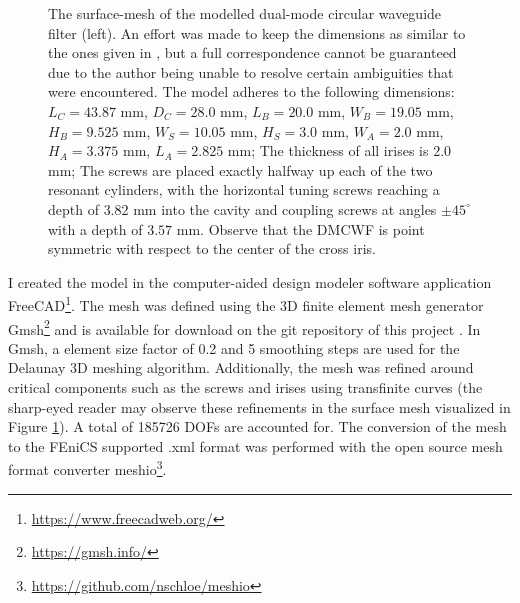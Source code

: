 \documentclass[11pt, a4paper]{article}
\begin{document}
\begin{figure}[h]
    \centering
    
    \caption{The surface-mesh of the modelled dual-mode circular waveguide filter
    (left). An effort was made to keep the dimensions as similar to the ones
    given in \cite{DMCWF-Dimensions}, but a full correspondence cannot be guaranteed
    due to the author being unable to resolve certain ambiguities that were encountered.
    The model adheres to the following dimensions:
    $L_C=43.87$ mm, $D_C=28.0$ mm, $L_B=20.0$ mm, $W_B=19.05$ mm, $H_B=9.525$ mm,
    $W_S=10.05$ mm, $H_S=3.0$ mm, $W_A=2.0$ mm, $H_A=3.375$ mm,
    $L_A=2.825$ mm; The thickness of all irises is $2.0$ mm; The screws
    are placed exactly halfway up each of the two resonant cylinders,
    with the horizontal tuning screws reaching a depth of $3.82$ mm into the cavity
    and coupling screws at angles $\pm 45^{\circ}$ with a depth of $3.57$ mm.
    Observe that the \acrshort{DMCWF} is point symmetric with respect to the center 
    of the cross iris.}
    \label{fig:DMCWF}
\end{figure}

I created the model in the computer-aided design modeler software application
FreeCAD\footnote{\url{https://www.freecadweb.org/}}. The mesh was defined using 
the 3D finite element mesh generator Gmsh\footnote{\url{https://gmsh.info/}} and 
is available for download on the git repository 
of this project \cite{git}. In Gmsh, a element size factor of 0.2 and 5 smoothing steps
are used for the Delaunay 3D meshing algorithm. Additionally, 
the mesh was refined around critical components such as the screws and irises
using transfinite curves (the sharp-eyed reader may observe these refinements
in the surface mesh visualized in Figure \ref{fig:DMCWF}). A total of
185726 \acrshort{DOF}s are accounted for. The conversion of the
mesh to the FEniCS supported .xml format was performed with the open source mesh
format converter meshio\footnote{\url{https://github.com/nschloe/meshio}}. 
\end{document}
